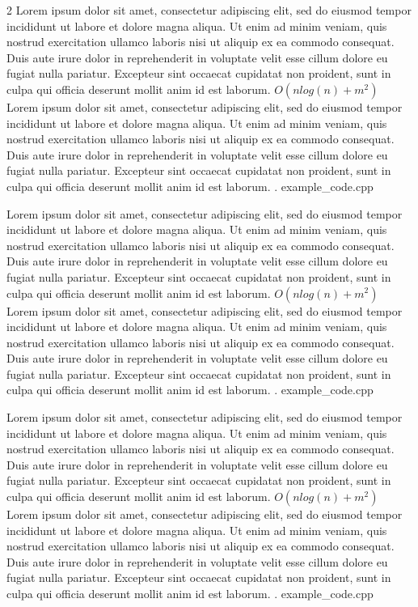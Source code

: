 \begin{multicols*}{2}
			{Lorem ipsum dolor sit amet, consectetur adipiscing elit, sed do eiusmod tempor incididunt ut labore et dolore magna aliqua. Ut enim ad minim veniam, quis nostrud exercitation ullamco laboris nisi ut aliquip ex ea commodo consequat. Duis aute irure dolor in reprehenderit in voluptate velit esse cillum dolore eu fugiat nulla pariatur. Excepteur sint occaecat cupidatat non proident, sunt in culpa qui officia deserunt mollit anim id est laborum.}
			{$O(nlog(n) + m^{2})$}
			{Lorem ipsum dolor sit amet, consectetur adipiscing elit, sed do eiusmod tempor incididunt ut labore et dolore magna aliqua. Ut enim ad minim veniam, quis nostrud exercitation ullamco laboris nisi ut aliquip ex ea commodo consequat. Duis aute irure dolor in reprehenderit in voluptate velit esse cillum dolore eu fugiat nulla pariatur. Excepteur sint occaecat cupidatat non proident, sunt in culpa qui officia deserunt mollit anim id est laborum.}
			{.}
			{example_code.cpp}
			
			{Lorem ipsum dolor sit amet, consectetur adipiscing elit, sed do eiusmod tempor incididunt ut labore et dolore magna aliqua. Ut enim ad minim veniam, quis nostrud exercitation ullamco laboris nisi ut aliquip ex ea commodo consequat. Duis aute irure dolor in reprehenderit in voluptate velit esse cillum dolore eu fugiat nulla pariatur. Excepteur sint occaecat cupidatat non proident, sunt in culpa qui officia deserunt mollit anim id est laborum.}
			{$O(nlog(n) + m^{2})$}
			{Lorem ipsum dolor sit amet, consectetur adipiscing elit, sed do eiusmod tempor incididunt ut labore et dolore magna aliqua. Ut enim ad minim veniam, quis nostrud exercitation ullamco laboris nisi ut aliquip ex ea commodo consequat. Duis aute irure dolor in reprehenderit in voluptate velit esse cillum dolore eu fugiat nulla pariatur. Excepteur sint occaecat cupidatat non proident, sunt in culpa qui officia deserunt mollit anim id est laborum.}
			{.}
			{example_code.cpp}
			
			{Lorem ipsum dolor sit amet, consectetur adipiscing elit, sed do eiusmod tempor incididunt ut labore et dolore magna aliqua. Ut enim ad minim veniam, quis nostrud exercitation ullamco laboris nisi ut aliquip ex ea commodo consequat. Duis aute irure dolor in reprehenderit in voluptate velit esse cillum dolore eu fugiat nulla pariatur. Excepteur sint occaecat cupidatat non proident, sunt in culpa qui officia deserunt mollit anim id est laborum.}
			{$O(nlog(n) + m^{2})$}
			{Lorem ipsum dolor sit amet, consectetur adipiscing elit, sed do eiusmod tempor incididunt ut labore et dolore magna aliqua. Ut enim ad minim veniam, quis nostrud exercitation ullamco laboris nisi ut aliquip ex ea commodo consequat. Duis aute irure dolor in reprehenderit in voluptate velit esse cillum dolore eu fugiat nulla pariatur. Excepteur sint occaecat cupidatat non proident, sunt in culpa qui officia deserunt mollit anim id est laborum.}
			{.}
			{example_code.cpp}
		\end{multicols*}
